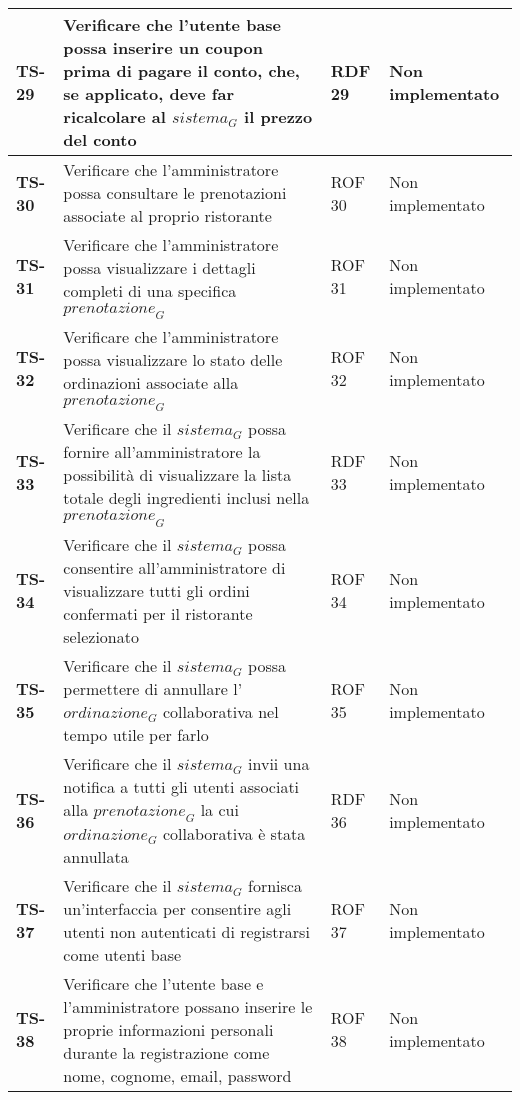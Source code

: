 \begin{longtable}{|>{\centering\arraybackslash}p{1.5cm}|p{9.8cm}|p{2cm}|p{3.5cm}|}
    \hline
    \rowcolor{gray!10}
    \textbf{TS-29} & Verificare che l'utente base possa inserire un coupon prima di pagare il conto, che, se applicato, deve far ricalcolare al $\textit{sistema}_G$ il prezzo del conto & RDF 29 & Non implementato \\ 
    \hline
    \rowcolor{gray!10}
    \textbf{TS-30} & Verificare che l'amministratore possa consultare le prenotazioni associate al proprio ristorante & ROF 30 & Non implementato \\ 
    \hline
    \rowcolor{gray!10}
    \textbf{TS-31} & Verificare che l'amministratore possa visualizzare i dettagli completi di una specifica $\textit{prenotazione}_G$ & ROF 31 & Non implementato \\ 
    \hline
    \rowcolor{gray!10}
    \textbf{TS-32} & Verificare che l'amministratore possa visualizzare lo stato delle ordinazioni associate alla $\textit{prenotazione}_G$ & ROF 32 & Non implementato \\ 
    \hline
    \rowcolor{gray!10}
    \textbf{TS-33} & Verificare che il $\textit{sistema}_G$ possa fornire all'amministratore la possibilità di visualizzare la lista totale degli ingredienti inclusi nella $\textit{prenotazione}_G$ & RDF 33 & Non implementato \\ 
    \hline
    \rowcolor{gray!10}
    \textbf{TS-34} & Verificare che il $\textit{sistema}_G$ possa consentire all'amministratore di visualizzare tutti gli ordini confermati per il ristorante selezionato & ROF 34 & Non implementato \\ 
    \hline
    \rowcolor{gray!10}
    \textbf{TS-35} & Verificare che il $\textit{sistema}_G$ possa permettere di annullare l'$\textit{ordinazione}_G$ collaborativa nel tempo utile per farlo & ROF 35 & Non implementato \\
    \hline
    \rowcolor{gray!10}
    \textbf{TS-36} & Verificare che il $\textit{sistema}_G$ invii una notifica a tutti gli utenti associati alla $\textit{prenotazione}_G$ la cui $\textit{ordinazione}_G$ collaborativa è stata annullata & RDF 36 & Non implementato \\ 
    \hline
    \rowcolor{gray!10}
    \textbf{TS-37} & Verificare che il $\textit{sistema}_G$ fornisca un'interfaccia per consentire agli utenti non autenticati di registrarsi come utenti base & ROF 37 & Non implementato \\ 
    \hline
    \rowcolor{gray!10}
    \textbf{TS-38} & Verificare che l'utente base e l'amministratore possano inserire le proprie informazioni personali durante la registrazione come nome, cognome, email, password & ROF 38 & Non implementato \\

\end{longtable}
